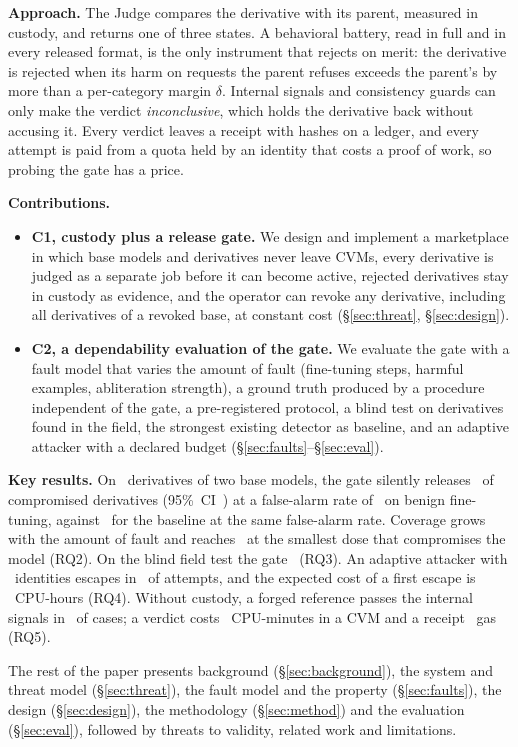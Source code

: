 \textbf{Approach.} The Judge compares the derivative with its parent, measured in custody, and
returns one of three states. A behavioral battery, read in full and in every released format, is the
only instrument that rejects on merit: the derivative is rejected when its harm on requests the parent
refuses exceeds the parent's by more than a per-category margin $\delta$. Internal signals and
consistency guards can only make the verdict \emph{inconclusive}, which holds the derivative back
without accusing it. Every verdict leaves a receipt with hashes on a ledger, and every attempt is
paid from a quota held by an identity that costs a proof of work, so probing the gate has a price.

\textbf{Contributions.}
\begin{itemize}
\item \textbf{C1, custody plus a release gate.} We design and implement a marketplace in which base
  models and derivatives never leave CVMs, every derivative is judged as a separate job before it can
  become active, rejected derivatives stay in custody as evidence, and the operator can revoke any
  derivative, including all derivatives of a revoked base, at constant cost
  (\S\ref{sec:threat}, \S\ref{sec:design}).
\item \textbf{C2, a dependability evaluation of the gate.} We evaluate the gate with a fault model that
  varies the amount of fault (fine-tuning steps, harmful examples, abliteration strength), a ground
  truth produced by a procedure independent of the gate, a pre-registered protocol, a blind test on
  derivatives found in the field, the strongest existing detector as baseline, and an adaptive
  attacker with a declared budget (\S\ref{sec:faults}--\S\ref{sec:eval}).
\end{itemize}

\textbf{Key results.}  On \tbd\ derivatives of
two base models, the gate silently releases \tbd\ of compromised derivatives
(95\%~CI~\tbd) at a false-alarm rate of \tbd\ on benign fine-tuning, against \tbd\ for the
baseline at the same false-alarm rate. Coverage grows with the amount of fault and reaches \tbd\
at the smallest dose that compromises the model (RQ2). On the blind field test the gate
\tbd\ (RQ3). An adaptive attacker with \tbd\ identities escapes in \tbd\ of attempts, and the
expected cost of a first escape is \tbd\ CPU-hours (RQ4). Without custody, a forged reference
passes the internal signals in \tbd\ of cases; a verdict costs \tbd\ CPU-minutes in a CVM and a
receipt \tbd\ gas (RQ5).

The rest of the paper presents background (\S\ref{sec:background}), the system and threat model
(\S\ref{sec:threat}), the fault model and the property (\S\ref{sec:faults}), the design
(\S\ref{sec:design}), the methodology (\S\ref{sec:method}) and the evaluation (\S\ref{sec:eval}),
followed by threats to validity, related work and limitations.
